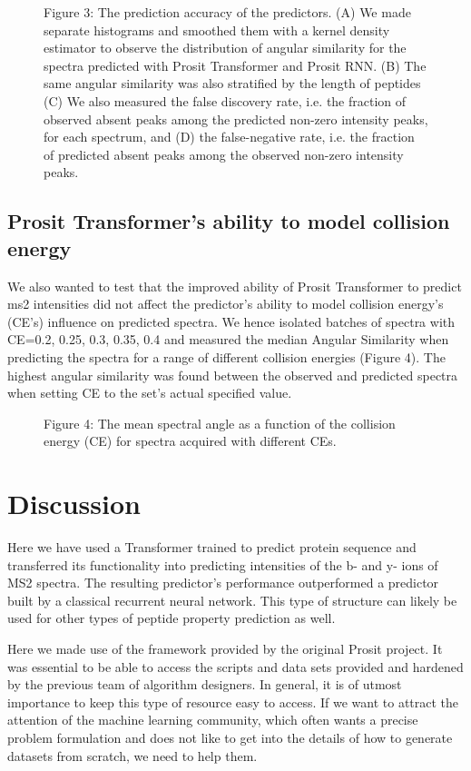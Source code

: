\documentclass[10pt,a4paper]{article}
\begin{document}
\begin{figure}[htb]
Figure 3: The prediction accuracy of the predictors. (A) We made separate histograms and smoothed them with a kernel density estimator to observe the distribution of angular similarity for the spectra predicted with Prosit Transformer and Prosit RNN. (B) The same angular similarity was also stratified by the length of peptides (C) We also measured the false discovery rate, i.e. the fraction of observed absent peaks among the predicted non-zero intensity peaks, for each spectrum, and (D) the false-negative rate, i.e. the fraction of predicted absent peaks among the observed non-zero intensity peaks.
\end{figure}

\subsection*{Prosit Transformer’s ability to model collision energy}

We also wanted to test that the improved ability of Prosit Transformer to predict ms2 intensities did not affect the predictor’s ability to model collision energy’s (CE’s) influence on predicted spectra. We hence isolated batches of spectra with CE={0.2, 0.25, 0.3, 0.35, 0.4} and measured the median Angular Similarity when predicting the spectra for a range of different collision energies (Figure 4). The highest angular similarity was found between the observed and predicted spectra when setting CE to the set’s actual specified value.




\begin{figure}
Figure 4: The mean spectral angle as a function of the collision energy (CE) for spectra acquired with different CEs. 
\end{figure}
 
\section*{Discussion}
Here we have used a Transformer trained to predict protein sequence and transferred its functionality into predicting intensities of the b- and y- ions of MS2 spectra. The resulting predictor’s performance outperformed a predictor built by a classical recurrent neural network. This type of structure can likely be used for other types of peptide property prediction as well.

Here we made use of the framework provided by the original Prosit project. It was essential to be able to access the scripts and data sets provided and hardened by the previous team of algorithm designers. In general, it is of utmost importance to keep this type of resource easy to access. If we want to attract the attention of the machine learning community, which often wants a precise problem formulation and does not like to get into the details of how to generate datasets from scratch, we need to help them.
\end{document}
